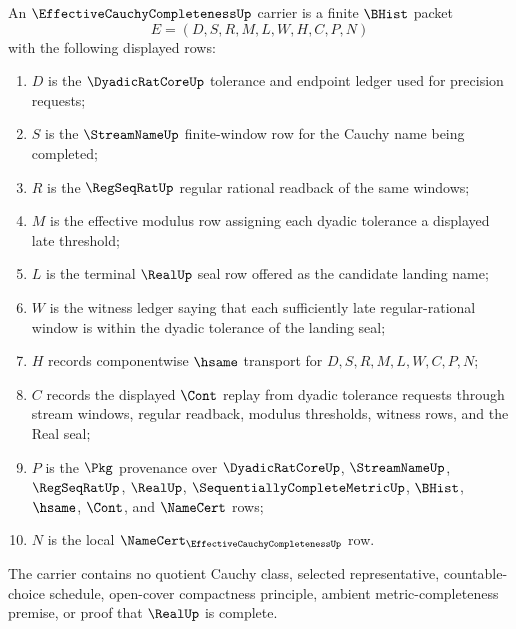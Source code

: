 \begin{definition}
\label{def:effective-cauchy-completeness-carrier}
An $\EffectiveCauchyCompletenessUp$ carrier is a finite $\BHist$ packet
$$
E=(D,S,R,M,L,W,H,C,P,N)
$$
with the following displayed rows:
\begin{enumerate}
\item $D$ is the $\DyadicRatCoreUp$ tolerance and endpoint ledger used for precision requests;
\item $S$ is the $\StreamNameUp$ finite-window row for the Cauchy name being completed;
\item $R$ is the $\RegSeqRatUp$ regular rational readback of the same windows;
\item $M$ is the effective modulus row assigning each dyadic tolerance a displayed late threshold;
\item $L$ is the terminal $\RealUp$ seal row offered as the candidate landing name;
\item $W$ is the witness ledger saying that each sufficiently late regular-rational window is within the dyadic tolerance of the landing seal;
\item $H$ records componentwise $\hsame$ transport for $D,S,R,M,L,W,C,P,N$;
\item $C$ records the displayed $\Cont$ replay from dyadic tolerance requests through stream windows, regular readback, modulus thresholds, witness rows, and the Real seal;
\item $P$ is the $\Pkg$ provenance over $\DyadicRatCoreUp$, $\StreamNameUp$, $\RegSeqRatUp$, $\RealUp$, $\SequentiallyCompleteMetricUp$, $\BHist$, $\hsame$, $\Cont$, and $\NameCert$ rows;
\item $N$ is the local $\NameCert_{\EffectiveCauchyCompletenessUp}$ row.
\end{enumerate}
The carrier contains no quotient Cauchy class, selected representative, countable-choice schedule, open-cover compactness principle, ambient metric-completeness premise, or proof that $\RealUp$ is complete.
\end{definition}


